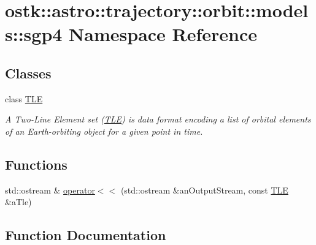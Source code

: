 \hypertarget{namespaceostk_1_1astro_1_1trajectory_1_1orbit_1_1models_1_1sgp4}{}\section{ostk\+:\+:astro\+:\+:trajectory\+:\+:orbit\+:\+:models\+:\+:sgp4 Namespace Reference}
\label{namespaceostk_1_1astro_1_1trajectory_1_1orbit_1_1models_1_1sgp4}
\subsection*{Classes}
\begin{DoxyCompactItemize}
\item 
class \hyperlink{classostk_1_1astro_1_1trajectory_1_1orbit_1_1models_1_1sgp4_1_1_t_l_e}{T\+LE}
\begin{DoxyCompactList}\small\item\em A Two-\/\+Line Element set (\hyperlink{classostk_1_1astro_1_1trajectory_1_1orbit_1_1models_1_1sgp4_1_1_t_l_e}{T\+LE}) is data format encoding a list of orbital elements of an Earth-\/orbiting object for a given point in time. \end{DoxyCompactList}\end{DoxyCompactItemize}
\subsection*{Functions}
\begin{DoxyCompactItemize}
\item 
std\+::ostream \& \hyperlink{namespaceostk_1_1astro_1_1trajectory_1_1orbit_1_1models_1_1sgp4_af9c603afa9f707d8ea9693bc3057be92}{operator$<$$<$} (std\+::ostream \&an\+Output\+Stream, const \hyperlink{classostk_1_1astro_1_1trajectory_1_1orbit_1_1models_1_1sgp4_1_1_t_l_e}{T\+LE} \&a\+Tle)
\end{DoxyCompactItemize}


\subsection{Function Documentation}
\mbox{\label{namespaceostk_1_1astro_1_1trajectory_1_1orbit_1_1models_1_1sgp4_af9c603afa9f707d8ea9693bc3057be92}} 
